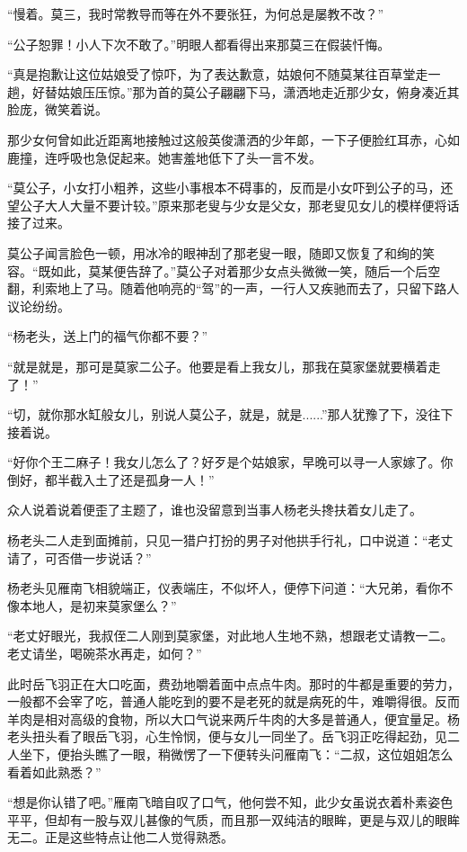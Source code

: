 “慢着。莫三，我时常教导而等在外不要张狂，为何总是屡教不改？”

“公子恕罪！小人下次不敢了。”明眼人都看得出来那莫三在假装忏悔。

“真是抱歉让这位姑娘受了惊吓，为了表达歉意，姑娘何不随莫某往百草堂走一趟，好替姑娘压压惊。”那为首的莫公子翩翩下马，潇洒地走近那少女，俯身凑近其脸庞，微笑着说。

那少女何曾如此近距离地接触过这般英俊潇洒的少年郞，一下子便脸红耳赤，心如鹿撞，连呼吸也急促起来。她害羞地低下了头一言不发。

“莫公子，小女打小粗养，这些小事根本不碍事的，反而是小女吓到公子的马，还望公子大人大量不要计较。”原来那老叟与少女是父女，那老叟见女儿的模样便将话接了过来。

莫公子闻言脸色一顿，用冰冷的眼神刮了那老叟一眼，随即又恢复了和绚的笑容。“既如此，莫某便告辞了。”莫公子对着那少女点头微微一笑，随后一个后空翻，利索地上了马。随着他响亮的“驾”的一声，一行人又疾驰而去了，只留下路人议论纷纷。

“杨老头，送上门的福气你都不要？”

“就是就是，那可是莫家二公子。他要是看上我女儿，那我在莫家堡就要横着走了！”

“切，就你那水缸般女儿，别说人莫公子，就是，就是......”那人犹豫了下，没往下接着说。

“好你个王二麻子！我女儿怎么了？好歹是个姑娘家，早晚可以寻一人家嫁了。你倒好，都半截入土了还是孤身一人！”

众人说着说着便歪了主题了，谁也没留意到当事人杨老头搀扶着女儿走了。

杨老头二人走到面摊前，只见一猎户打扮的男子对他拱手行礼，口中说道：“老丈请了，可否借一步说话？”

杨老头见雁南飞相貌端正，仪表端庄，不似坏人，便停下问道：“大兄弟，看你不像本地人，是初来莫家堡么？”

“老丈好眼光，我叔侄二人刚到莫家堡，对此地人生地不熟，想跟老丈请教一二。老丈请坐，喝碗茶水再走，如何？”

此时岳飞羽正在大口吃面，费劲地嚼着面中点点牛肉。那时的牛都是重要的劳力，一般都不会宰了吃，普通人能吃到的要不是老死的就是病死的牛，难嚼得很。反而羊肉是相对高级的食物，所以大口气说来两斤牛肉的大多是普通人，便宜量足。杨老头扭头看了眼岳飞羽，心生怜悯，便与女儿一同坐了。岳飞羽正吃得起劲，见二人坐下，便抬头瞧了一眼，稍微愣了一下便转头问雁南飞：“二叔，这位姐姐怎么看着如此熟悉？”

“想是你认错了吧。”雁南飞暗自叹了口气，他何尝不知，此少女虽说衣着朴素姿色平平，但却有一股与双儿甚像的气质，而且那一双纯洁的眼眸，更是与双儿的眼眸无二。正是这些特点让他二人觉得熟悉。

